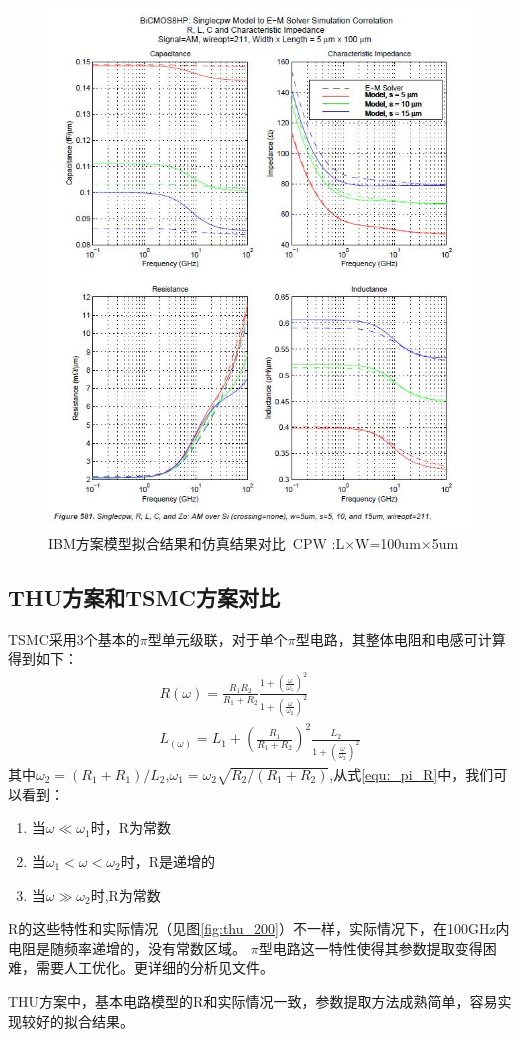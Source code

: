 \documentclass[UTF8,a4paper,zihao=-4]{ctexart}
\begin{document}
\begin{figure}
  \centering
  \includegraphics[width=14 cm]{IBM_sim.jpg}
  \caption{IBM方案模型拟合结果和仿真结果对比\ CPW :L$\times$W=100um$\times$5um}\label{fig:ibm_100}
\end{figure}

\subsection{THU方案和TSMC方案对比}
TSMC采用3个基本的$\pi$型单元级联，对于单个$\pi$型电路，其整体电阻和电感可计算得到如下：
\begin{gather}
  R(\omega)=\frac{R_1R_2}{R_1+R_2}\frac{1+(\frac{\omega}{\omega_1})^2}{1+(\frac{\omega}{\omega_2})^2} \label{equ:_pi_R}\\
  L_{(\omega)}=L_1+(\frac{R_1}{R_1+R_2})^2 \frac{L_2}{1+(\frac{\omega}{\omega_2})^2}
\end{gather}
其中$\omega_2=(R_1+R_1)/L_2$,$\omega_1=\omega_2\sqrt{R_2/(R_1+R_2)}$,从式\ref{equ:_pi_R}中，我们可以看到：
\begin{enumerate}[itemsep=1pt, topsep=12pt, partopsep=0pt,label={(\arabic*)}] %
  \item 当$\omega\ll\omega_1$时，R为常数
  \item 当$\omega_1 < \omega < \omega_2$时，R是递增的
  \item 当$\omega \gg \omega_2$时,R为常数
\end{enumerate}
R的这些特性和实际情况（见图\ref{fig:thu_200}）不一样，实际情况下，在100GHz内电阻是随频率递增的，没有常数区域。
$\pi$型电路这一特性使得其参数提取变得困难，需要人工优化。更详细的分析见文件\cite{brinkhoff2008scalable}。
\par
THU方案中，基本电路模型的R和实际情况一致，参数提取方法成熟简单，容易实现较好的拟合结果。
\end{document}
